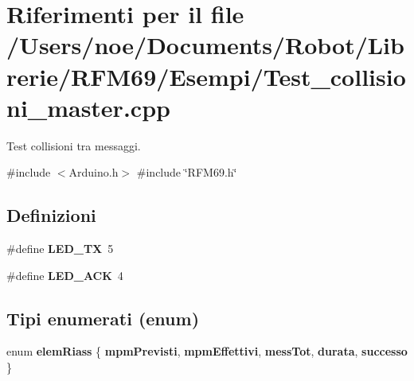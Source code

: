 \section{Riferimenti per il file /\+Users/noe/\+Documents/\+Robot/\+Librerie/\+R\+F\+M69/\+Esempi/\+Test\+\_\+collisioni\+\_\+master.cpp}
\label{_test__collisioni__master_8cpp}


Test collisioni tra messaggi.  


{\ttfamily \#include $<$Arduino.\+h$>$}\newline
{\ttfamily \#include \char`\"{}R\+F\+M69.\+h\char`\"{}}\newline
\subsection*{Definizioni}
\begin{DoxyCompactItemize}
\item 
\mbox{\label{_test__collisioni__master_8cpp_a66dbe921e452d7831e1f1f7ff8d720ff}} 
\#define {\bfseries L\+E\+D\+\_\+\+TX}~5
\item 
\mbox{\label{_test__collisioni__master_8cpp_a365035e660d1eae73ced4109ba9f8288}} 
\#define {\bfseries L\+E\+D\+\_\+\+A\+CK}~4
\end{DoxyCompactItemize}
\subsection*{Tipi enumerati (enum)}
\begin{DoxyCompactItemize}
\item 
\mbox{\label{_test__collisioni__master_8cpp_a6443c45b3c39356944733bd5845b0823}} 
enum {\bfseries elem\+Riass} \{ \newline
{\bfseries mpm\+Previsti}, 
{\bfseries mpm\+Effettivi}, 
{\bfseries mess\+Tot}, 
{\bfseries durata}, 
\newline
{\bfseries successo}
 \}
\end{DoxyCompactItemize}

